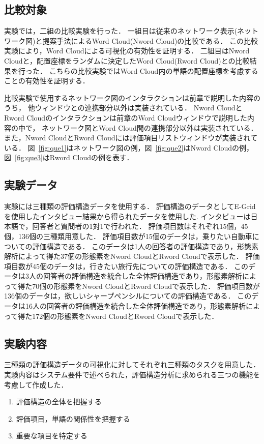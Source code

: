 \documentclass[syuuron]{kuee}
\begin{document}
		\subsection{比較対象}
			実験では，二組の比較実験を行った．
			一組目は従来のネットワーク表示(ネットワーク図)と提案手法によるWord Cloud(Nword Cloud)の比較である．
			この比較実験により，Word Cloudによる可視化の有効性を証明する．
			二組目はNword Cloudと，配置座標をランダムに決定したWord Cloud(Rword Cloud)との比較結果を行った．
			こちらの比較実験ではWord Cloud内の単語の配置座標を考慮することの有効性を証明する．
			
			比較実験で使用するネットワーク図のインタラクションは前章で説明した内容のうち，
			他ウィンドウとの連携部分以外は実装されている．
			Nword CloudとRword Cloudのインタラクションは前章のWord Cloudウィンドウで説明した内容の中で，
			ネットワーク図とWord Cloud間の連携部分以外は実装されている．
			また，Nword CloudとRword Cloudには評価項目リストウィンドウが実装されている．
			図~\ref{fig:que1}はネットワーク図の例，図~\ref{fig:que2}はNword Cloudの例，
			図~\ref{fig:que3}はRword Cloudの例を表す．
			
		\subsection{実験データ}
			実験には三種類の評価構造データを使用する．
			評価構造のデータとしてE-Gridを使用したインタビュー結果から得られたデータを使用した.
			インタビューは日本語で，回答者と質問者の1対1で行われた．
			評価項目数はそれぞれ15個，45個，136個の三種類用意した．
			評価項目数が15個のデータは，乗りたい自動車についての評価構造である．
			このデータは1人の回答者の評価構造であり，形態素解析によって得た37個の形態素をNword CloudとRword Cloudで表示した．
			評価項目数が45個のデータは，行きたい旅行先についての評価構造である．
			このデータは3人の回答者の評価構造を統合した全体評価構造であり，形態素解析によって得た70個の形態素をNword CloudとRword Cloudで表示した．
			評価項目数が136個のデータは，欲しいシャープペンシルについての評価構造である．
			このデータは16人の回答者の評価構造を統合した全体評価構造であり，形態素解析によって得た172個の形態素をNword CloudとRword Cloudで表示した．
		
		\subsection{実験内容}
			三種類の評価構造データの可視化に対してそれぞれ三種類のタスクを用意した．
			実験内容はシステム要件で述べられた，評価構造分析に求められる三つの機能を考慮して作成した．
			\begin{enumerate}
				\item 評価構造の全体を把握する
				\item 評価項目，単語の関係性を把握する
				\item 重要な項目を特定する
			\end{enumerate}
\end{document}
